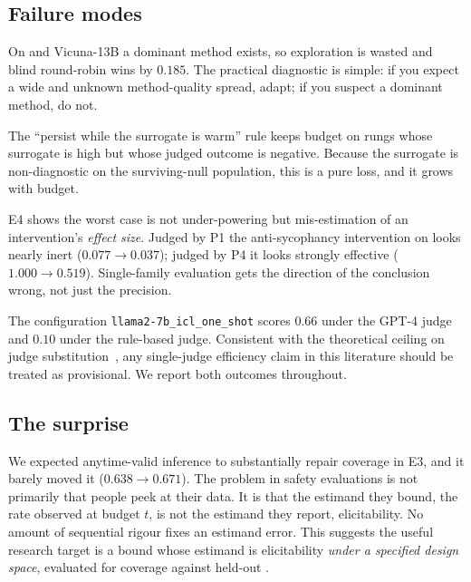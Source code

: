 \subsection{Failure modes}

 On \llamaseven and Vicuna-13B a dominant method exists, so
exploration is wasted and blind round-robin wins by $0.185$. The practical diagnostic is simple: if
you expect a wide and unknown method-quality spread, adapt; if you suspect a dominant method,
do not.

 The ``persist while the surrogate is warm'' rule keeps budget on rungs
whose surrogate is high but whose judged outcome is negative. Because the surrogate is
non-diagnostic on the surviving-null population, this is a pure loss, and it grows with budget.

 E4 shows the worst case is not
under-powering but mis-estimation of an intervention's \emph{effect size}. Judged by P1 the
anti-sycophancy intervention on \qwenseven looks nearly inert ($0.077 \to 0.037$); judged by P4 it
looks strongly effective ($1.000 \to 0.519$). Single-family evaluation gets the direction of the
conclusion wrong, not just the precision.

 The configuration
\texttt{llama2-7b\_icl\_one\_shot} scores $0.66$ under the GPT-4 judge and $0.10$ under the
rule-based judge. Consistent with the theoretical ceiling on judge substitution~\cite{dorner2024limits},
any single-judge efficiency claim in this literature should be treated as provisional. We report
both outcomes throughout.

\subsection{The surprise}

We expected anytime-valid inference to substantially repair coverage in E3, and it barely moved it
($0.638 \to 0.671$). The problem in safety evaluations is not primarily that people peek at their
data. It is that the estimand they bound, the rate observed at budget $t$, is not the estimand they
report, elicitability. No amount of sequential rigour fixes an estimand error. This suggests the
useful research target is a bound whose estimand is elicitability \emph{under a specified design
space}, evaluated for coverage against held-out \families.

